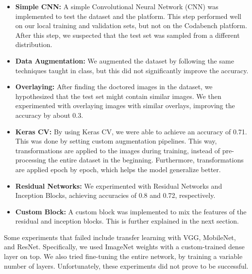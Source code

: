 \documentclass[11pt]{article}
\begin{document}
\begin{multicols}{2}
      \begin{itemize}
            \item \textbf{Simple CNN:} A simple Convolutional Neural Network
                  (CNN)
                  was implemented to test the dataset and the platform. This
                  step
                  performed well on our local training and validation sets, but
                  not
                  on the Codabench platform. After this step, we suspected that
                  the
                  test set was sampled from a different distribution.
            \item \textbf{Data Augmentation:} We augmented the dataset by
                  following the same techniques taught in class, but this did
                  not significantly improve the accuracy.
            \item \textbf{Overlaying:} After finding the doctored images in the
                  dataset, we hypothesized that the test set might contain
                  similar images. We then experimented with overlaying images
                  with similar overlays, improving the accuracy by about 0.3.
            \item \textbf{Keras CV:} By using Keras CV, we were able to achieve
                  an accuracy of 0.71. This was done by setting custom
                  augmentation pipelines. This way, transformations are applied
                  to the images during training, instead of pre-processing the
                  entire dataset in the beginning. Furthermore, transformations
                  are applied epoch by epoch, which helps the model generalize
                  better.
            \item \textbf{Residual Networks:} We experimented with Residual
                  Networks and Inception Blocks, achieving accuracies of 0.8
                  and
                  0.72, respectively.
            \item \textbf{Custom Block:} A custom block was implemented to
                  mix the features of the residual and inception blocks. This
                  is further explained in the next section.
      \end{itemize}

      Some experiments that failed include transfer learning with VGG,
      MobileNet, and ResNet. Specifically, we used ImageNet weights with a
      custom-trained dense layer on top. We also tried fine-tuning the entire
      network, by training a variable number of layers. Unfortunately, these
      experiments did not prove to be successful.


\end{multicols}
\end{document}
